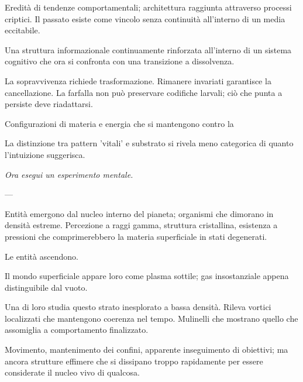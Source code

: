 \medskip

Eredità di tendenze comportamentali; architettura raggiunta attraverso processi criptici. Il passato esiste come vincolo senza continuità all'interno di un media eccitabile.

\medskip

Una struttura informazionale continuamente rinforzata all'interno di un sistema cognitivo che ora si confronta con una transizione a dissolvenza. 

\medskip

La sopravvivenza richiede trasformazione. Rimanere invariati garantisce la cancellazione. La farfalla non può preservare codifiche larvali; ciò che punta a persiste deve riadattarsi.

\medskip

Configurazioni di materia e energia che si mantengono contro la 

\medskip

La distinzione tra pattern 'vitali' e substrato si rivela meno categorica di quanto l'intuizione suggerisca. 

\medskip

\textit{Ora esegui un esperimento mentale.}

---

Entità emergono dal nucleo interno del pianeta; organismi che dimorano in densità estreme. Percezione a raggi gamma, struttura cristallina, esistenza a pressioni che comprimerebbero la materia superficiale in stati degenerati.

\medskip

Le entità ascendono.

\medskip

Il mondo superficiale appare loro come plasma sottile; gas insostanziale appena distinguibile dal vuoto.


\medskip

Una di loro studia questo strato inesplorato a bassa densità. Rileva vortici localizzati che mantengono coerenza nel tempo. Mulinelli che mostrano quello che assomiglia a comportamento finalizzato. 

\medskip

Movimento, mantenimento dei confini, apparente inseguimento di obiettivi; ma ancora strutture effimere che si dissipano troppo rapidamente per essere considerate il nucleo vivo di qualcosa.

